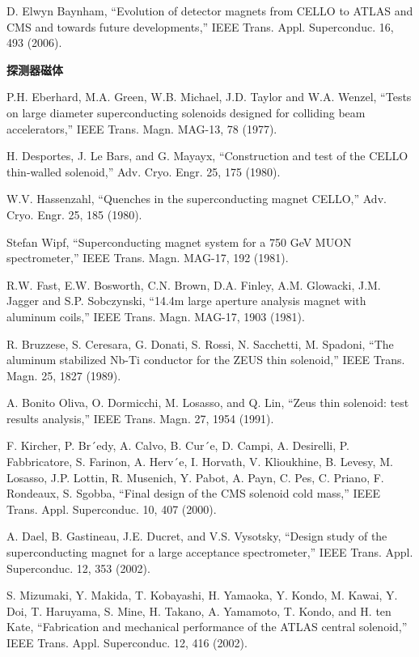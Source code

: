 \noindent [9.284] D. Elwyn Baynham, ``Evolution of detector magnets from CELLO to ATLAS
and CMS and towards future developments,” IEEE Trans. Appl. Superconduc.
16, 493 (2006).

\noindent \textbf{探测器磁体}

\noindent [9.285] P.H. Eberhard, M.A. Green, W.B. Michael, J.D. Taylor and W.A. Wenzel, ``Tests
on large diameter superconducting solenoids designed for colliding beam accelerators,”
IEEE Trans. Magn. MAG-13, 78 (1977).

\noindent [9.286] H. Desportes, J. Le Bars, and G. Mayayx, ``Construction and test of the CELLO
thin-walled solenoid,” Adv. Cryo. Engr. 25, 175 (1980).

\noindent [9.287] W.V. Hassenzahl, ``Quenches in the superconducting magnet CELLO,” Adv.
Cryo. Engr. 25, 185 (1980).

\noindent [9.288] Stefan Wipf, ``Superconducting magnet system for a 750 GeV MUON spectrometer,”
IEEE Trans. Magn. MAG-17, 192 (1981).

\noindent [9.289] R.W. Fast, E.W. Bosworth, C.N. Brown, D.A. Finley, A.M. Glowacki, J.M. Jagger
and S.P. Sobczynski, ``14.4m large aperture analysis magnet with aluminum
coils,” IEEE Trans. Magn. MAG-17, 1903 (1981).

\noindent [9.290] R. Bruzzese, S. Ceresara, G. Donati, S. Rossi, N. Sacchetti, M. Spadoni, ``The
aluminum stabilized Nb-Ti conductor for the ZEUS thin solenoid,” IEEE Trans.
Magn. 25, 1827 (1989).

\noindent [9.291] A. Bonito Oliva, O. Dormicchi, M. Losasso, and Q. Lin, ``Zeus thin solenoid: test
results analysis,” IEEE Trans. Magn. 27, 1954 (1991).

\noindent [9.292] F. Kircher, P. Br´edy, A. Calvo, B. Cur´e, D. Campi, A. Desirelli, P. Fabbricatore,
S. Farinon, A. Herv´e, I. Horvath, V. Klioukhine, B. Levesy, M. Losasso, J.P. Lottin,
R. Musenich, Y. Pabot, A. Payn, C. Pes, C. Priano, F. Rondeaux, S. Sgobba,
``Final design of the CMS solenoid cold mass,” IEEE Trans. Appl. Superconduc.
10, 407 (2000).

\noindent [9.293] A. Dael, B. Gastineau, J.E. Ducret, and V.S. Vysotsky, ``Design study of the
superconducting magnet for a large acceptance spectrometer,” IEEE Trans. Appl.
Superconduc. 12, 353 (2002).

\noindent [9.294] S. Mizumaki, Y. Makida, T. Kobayashi, H. Yamaoka, Y. Kondo, M. Kawai,
Y. Doi, T. Haruyama, S. Mine, H. Takano, A. Yamamoto, T. Kondo, and H. ten
Kate, ``Fabrication and mechanical performance of the ATLAS central solenoid,”
IEEE Trans. Appl. Superconduc. 12, 416 (2002).

